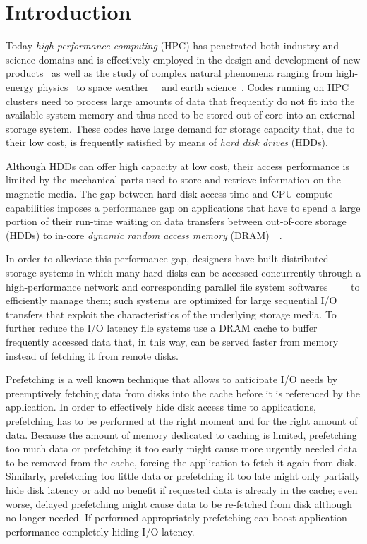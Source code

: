 \chapter{Introduction} \label{chapt: introduction}
Today \textit{high performance computing} (HPC) has penetrated both industry and science domains and is effectively employed in the design and development of new products~\cite{Isaac2013} as well as the study of 
complex natural phenomena ranging from high-energy physics~\cite{Chatrchyan2011} to space weather~\cite{Markidis2010}~\cite{Deca2013} and earth science~\cite{Sobhaninejad2011}. Codes running on HPC clusters need 
to process large amounts of data that frequently do not fit into the available system memory and thus need to be stored out-of-core into an external storage system. These codes have large demand for storage capacity 
that, due to their low cost, is frequently satisfied by means of \textit{hard disk drives} (HDDs). 

Although HDDs can offer high capacity at low cost, their access performance is limited by the mechanical parts used to store and retrieve information on the magnetic media. The gap between hard disk access time and 
CPU compute capabilities imposes a performance gap on applications that have to spend a large portion of their run-time waiting on data transfers between out-of-core storage (HDDs) to in-core \textit{dynamic random
access memory} (DRAM)~\cite{CarnsHABLLR11}~\cite{ChenR10}. 

In order to alleviate this performance gap, designers have built distributed storage systems in which many hard disks can be accessed concurrently through a high-performance network and corresponding parallel file system 
softwares~\cite{Braam02}~\cite{SchmuckH02}~\cite{CarnsLRT}~\cite{Heichler2014} to efficiently manage them; such systems are optimized for large sequential I/O transfers that exploit the characteristics of the underlying storage media. 
To further reduce the I/O latency file systems use a DRAM cache to buffer frequently accessed data that, in this way, can be served faster from memory instead of fetching it from remote disks.

Prefetching is a well known technique that allows to anticipate I/O needs by preemptively fetching data from disks into the cache before it is referenced by the application. In order to effectively hide disk 
access time to applications, prefetching has to be performed at the right moment and for the right amount of data. Because the amount of memory dedicated to caching is limited, prefetching too much data or
prefetching it too early might cause more urgently needed data to be removed from the cache, forcing the application to fetch it again from disk. Similarly, prefetching too little data or prefetching it too late 
might only partially hide disk latency or add no benefit if requested data is already in the cache; even worse, delayed prefetching might cause data to be re-fetched from disk although no longer needed. If performed 
appropriately prefetching can boost application performance completely hiding I/O latency. %

